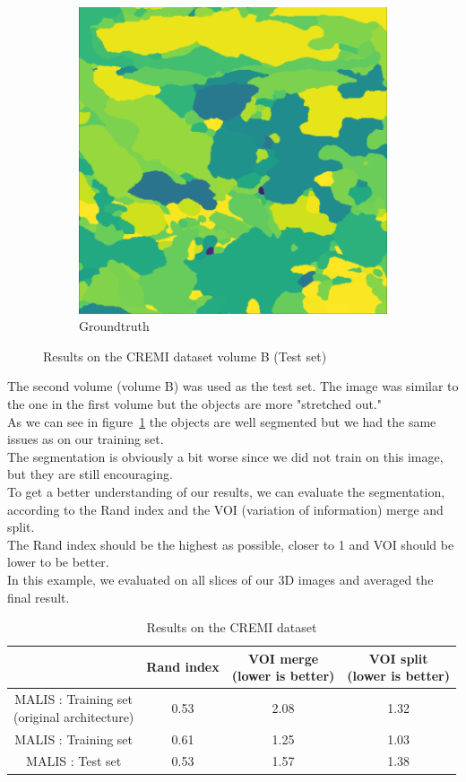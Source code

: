 \begin{figure}[!htbp]
\begin{subfigure}[t]{0.31\textwidth}
        \includegraphics[height=0.7\textwidth]{./images/cremi_gt_2.png}
        \caption{Groundtruth}
    \end{subfigure}
	\caption{Results on the CREMI dataset volume B (Test set)}
	\label{fig:cremi_results_b}
\end{figure}

The second volume (volume B) was used as the test set.
The image was similar to the one in the first volume but the objects are more
"stretched out."\\
As we can see in figure~\ref{fig:cremi_results_b} the objects are well
segmented but we had the same issues as on our training set.\\
The segmentation is obviously a bit worse since we did not train on this image,
but they are still encouraging.\\

To get a better understanding of our results, we can evaluate the segmentation, 
according to the Rand index and the VOI (variation of information) merge and split.\\ 
The Rand index should be the highest as possible, closer to 1 and VOI should be lower to be better.\\
In this example, we evaluated on all slices of our 3D images and averaged the
final result.\\

\begin{table}[!htbp]
	\centering
	\begin{tabular}{|c|c|c|c|}
		\hline
		& Rand index & \thead{VOI merge \\(lower is better)} & \thead{VOI split\\(lower is better)} \\
		\hline
		\makecell{MALIS : Training set \\(original architecture)} & 0.53 & 2.08 & 1.32\\
		\hline
		MALIS : Training set & 0.61 & 1.25 & 1.03\\
		\hline
		MALIS : Test set & 0.53 & 1.57 & 1.38\\
		\hline
	\end{tabular}
	\caption{Results on the CREMI dataset}
\label{tab:cremi_res}
\end{table}

